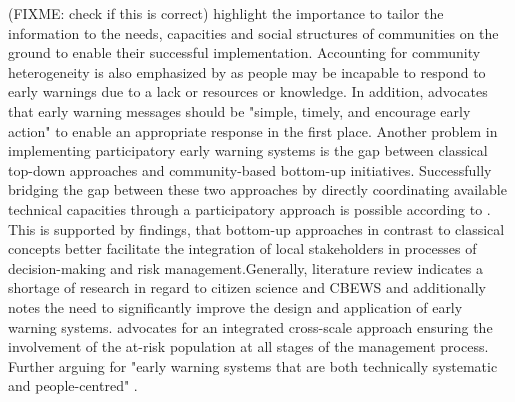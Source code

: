(FIXME: check if this is correct)\autocite{gladfelterPoliticsParticipationCommunitybased2018,inayathEARLYWARNINGSYSTEM2018,trogrlicIndigenousKnowledgeEarly2018} highlight the importance to tailor the information to the needs, capacities and social structures of communities on the ground to enable their successful implementation. Accounting for community heterogeneity is also emphasized by \autocite{gladfelterPoliticsParticipationCommunitybased2018} as people may be incapable to respond to early warnings due to a lack or resources or knowledge. In addition, \autocite[21]{inayathEARLYWARNINGSYSTEM2018} advocates that early warning messages should be "simple, timely, and encourage early action" to enable an appropriate response in the first place.
Another problem in implementing participatory early warning systems is the gap between classical top-down approaches and community-based bottom-up initiatives. Successfully bridging the gap between these two approaches by directly coordinating available technical capacities through a participatory approach is possible according to \autocite{tarchianiCommunityImpactBased2020}. This is supported by \autocite{henriksenParticipatoryEarlyWarning2018} findings, that bottom-up approaches in contrast to classical concepts better facilitate the integration of local stakeholders in processes of decision-making and risk management.Generally, \autocite{marcheziniReviewStudiesParticipatory2018} literature review indicates a shortage of research in regard to citizen science and CBEWS and \autocite{baudoinEarlyWarningSystems2014} additionally notes the need to significantly improve the design and application of early warning systems. \autocite{baudoinEarlyWarningSystems2014} advocates for an integrated cross-scale approach ensuring the involvement of the at-risk population at all stages of the management process. Further arguing for "early warning systems that are both technically systematic and people-centred" \autocite[15]{baudoinEarlyWarningSystems2014}.






